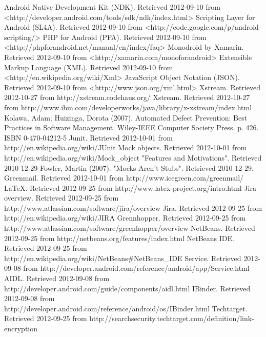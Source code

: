 \documentclass[12pt]{report}
\begin{document}
\begin{thebibliography}{99}
 Android Native Development Kit (NDK). Retrieved 2012-09-10 from <http://developer.android.com/tools/sdk/ndk/index.html>
 Scripting Layer for Android (SL4A). Retrieved 2012-09-10 from <http://code.google.com/p/android-scripting/>
 PHP for Android (PFA). Retrieved 2012-09-10 from <http://phpforandroid.net/manual/en/index/faq>
 Monodroid by Xamarin. Retrieved 2012-09-10 from <http://xamarin.com/monoforandroid>
 Extensible Markup Language (XML). Retrieved 2012-09-10 from <http://en.wikipedia.org/wiki/Xml>
 JavaScript Object Notation (JSON). Retrieved 2012-09-10 from <http://www.json.org/xml.html>
 Xstream. Retrieved 2012-10-27 from http://xstream.codehaus.org/
 Xstream. Retrieved 2012-10-27 from http://www.ibm.com/developerworks/java/library/x-xstream/index.html
 Kolawa, Adam; Huizinga, Dorota (2007). Automated Defect Prevention: Best Practices in Software Management. Wiley-IEEE Computer Society Press. p. 426. ISBN 0-470-04212-5
 Junit. Retrieved 2012-10-01 from http://en.wikipedia.org/wiki/JUnit
 Mock objects. Retrieved 2012-10-01 from http://en.wikipedia.org/wiki/Mock\_object
 "Features and Motivations". Retrieved 2010-12-29
 Fowler, Martin (2007). "Mocks Aren't Stubs". Retrieved 2010-12-29.
 Greenmail. Retrieved 2012-10-01 from http://www.icegreen.com/greenmail/
 LaTeX. Retrieved 2012-09-25 from http://www.latex-project.org/intro.html
 Jira overview. Retrieved 2012-09-25 from http://www.atlassian.com/software/jira/overview
 Jira. Retrieved 2012-09-25 from http://en.wikipedia.org/wiki/JIRA
 Grennhopper. Retrieved 2012-09-25 from http://www.atlassian.com/software/greenhopper/overview
 NetBeans. Retrieved 2012-09-25 from http://netbeans.org/features/index.html
 NetBeans IDE. Retrieved 2012-09-25 from http://en.wikipedia.org/wiki/NetBeans\#NetBeans\_IDE
 Service. Retrieved 2012-09-08 from http://developer.android.com/reference/android/app/Service.html
 AIDL. Retrieved 2012-09-08 from http://developer.android.com/guide/components/aidl.html
 IBinder. Retrieved 2012-09-08 from http://developer.android.com/reference/android/os/IBinder.html
 Techtarget. Retrieved 2012-09-25 from http://searchsecurity.techtarget.com/definition/link-encryption

\end{thebibliography}
\end{document}
